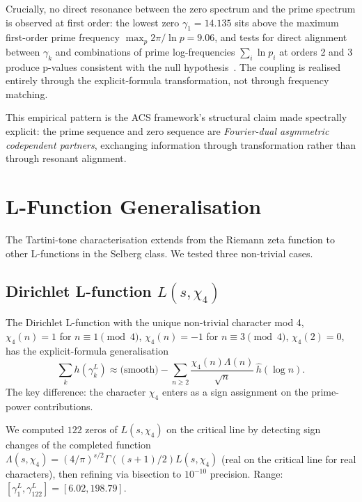 \documentclass[11pt,a4paper]{article}
\theoremstyle{plain}
\theoremstyle{definition}
\theoremstyle{remark}
\begin{document}
Crucially, no direct resonance between the zero spectrum and the prime
spectrum is observed at first order: the lowest zero
$\gamma_1 = 14.135$ sits above the maximum first-order prime
frequency $\max_p 2\pi/\ln p = 9.06$, and tests for direct alignment
between $\gamma_k$ and combinations of prime log-frequencies
$\sum_i \ln p_i$ at orders 2 and 3 produce p-values consistent with
the null hypothesis~\cite{TartiniMap}. The coupling is realised
entirely through the explicit-formula transformation, not through
frequency matching.

This empirical pattern is the ACS framework's structural claim made
spectrally explicit: the prime sequence and zero sequence are
\emph{Fourier-dual asymmetric codependent partners}, exchanging
information through transformation rather than through resonant
alignment.


\section{L-Function Generalisation}
\label{sec:lfunctions}

The Tartini-tone characterisation extends from the Riemann zeta
function to other L-functions in the Selberg class. We tested three
non-trivial cases.

\subsection{Dirichlet L-function $L(s, \chi_4)$}
\label{sec:L-chi4}

The Dirichlet L-function with the unique non-trivial character mod 4,
$\chi_4(n) = 1$ for $n \equiv 1 \pmod{4}$, $\chi_4(n) = -1$ for
$n \equiv 3 \pmod{4}$, $\chi_4(2) = 0$, has the explicit-formula
generalisation
\begin{equation}
  \sum_k h(\gamma_k^L) \approx \text{(smooth)} - \sum_{n \geq 2}
  \frac{\chi_4(n) \Lambda(n)}{\sqrt{n}}\, \hat{h}(\log n).
  \label{eq:L-explicit}
\end{equation}
The key difference: the character $\chi_4$ enters as a sign
assignment on the prime-power contributions.

We computed $122$ zeros of $L(s, \chi_4)$ on the critical line by
detecting sign changes of the completed function
$\Lambda(s, \chi_4) = (4/\pi)^{s/2} \Gamma((s+1)/2) L(s, \chi_4)$
(real on the critical line for real characters), then refining via
bisection to $10^{-10}$ precision. Range: $[\gamma_1^L, \gamma_{122}^L]
= [6.02, 198.79]$.
\end{document}
